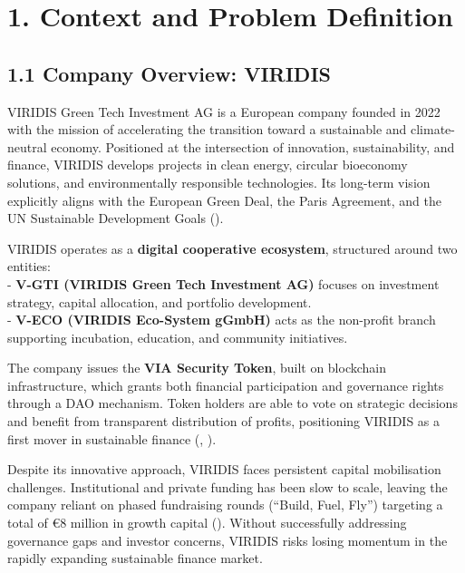 \documentclass[
  english,
  12pt,
  oneside,
  open=any]{scrbook}
\begin{document}
\chapter{1. Context and Problem Definition}\label{sec-context}

\section{1.1 Company Overview: VIRIDIS}\label{sec-company}

VIRIDIS Green Tech Investment AG is a European company founded in 2022
with the mission of accelerating the transition toward a sustainable and
climate-neutral economy. Positioned at the intersection of innovation,
sustainability, and finance, VIRIDIS develops projects in clean energy,
circular bioeconomy solutions, and environmentally responsible
technologies. Its long-term vision explicitly aligns with the European
Green Deal, the Paris Agreement, and the UN Sustainable Development
Goals
().

VIRIDIS operates as a \textbf{digital cooperative ecosystem}, structured
around two entities:\\
- \textbf{V-GTI (VIRIDIS Green Tech Investment AG)} focuses on
investment strategy, capital allocation, and portfolio development.\\
- \textbf{V-ECO (VIRIDIS Eco-System gGmbH)} acts as the non-profit
branch supporting incubation, education, and community initiatives.

The company issues the \textbf{VIA Security Token}, built on blockchain
infrastructure, which grants both financial participation and governance
rights through a DAO mechanism. Token holders are able to vote on
strategic decisions and benefit from transparent distribution of
profits, positioning VIRIDIS as a first mover in sustainable finance
(,
).

Despite its innovative approach, VIRIDIS faces persistent capital
mobilisation challenges. Institutional and private funding has been slow
to scale, leaving the company reliant on phased fundraising rounds
(``Build, Fuel, Fly'') targeting a total of €8 million in growth capital
(). Without
successfully addressing governance gaps and investor concerns, VIRIDIS
risks losing momentum in the rapidly expanding sustainable finance
market.
\end{document}
